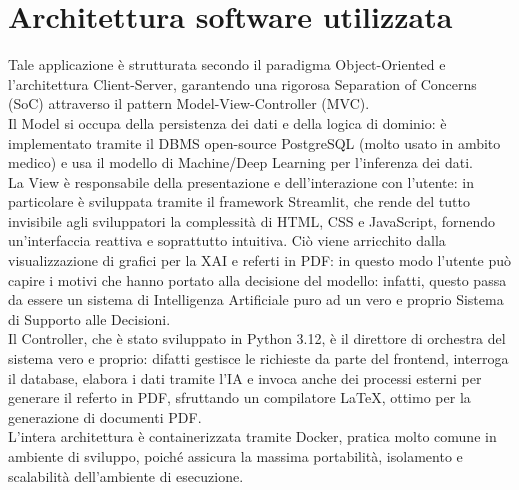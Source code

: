 \documentclass[10pt,a4paper]{article}
\begin{document}
    \section*{Architettura software utilizzata}
        Tale applicazione è strutturata secondo il paradigma Object-Oriented e l'architettura Client-Server, garantendo 
        una rigorosa Separation of Concerns (SoC) attraverso il pattern Model-View-Controller (MVC). \\
        Il Model si occupa della persistenza dei dati e della logica di dominio: è implementato tramite il DBMS 
        open-source PostgreSQL (molto usato in ambito medico) e usa il modello di Machine/Deep Learning per l'inferenza 
        dei dati. \\
        La View è responsabile della presentazione e dell'interazione con l'utente: in particolare è sviluppata tramite il 
        framework Streamlit, che rende del tutto invisibile agli sviluppatori la complessità di HTML, CSS e JavaScript,
        fornendo un'interfaccia reattiva e soprattutto intuitiva. Ciò viene arricchito dalla visualizzazione di grafici 
        per la XAI e referti in PDF: in questo modo l'utente può capire i motivi che hanno portato alla
        decisione del modello: infatti, questo passa da essere un sistema di Intelligenza Artificiale puro ad un vero e
        proprio Sistema di Supporto alle Decisioni. \\
        Il Controller, che è stato sviluppato in Python 3.12, è il direttore di orchestra del sistema vero e proprio: 
        difatti gestisce le richieste da parte del frontend, interroga il database, elabora i dati tramite l'IA e invoca
        anche dei processi esterni per generare il referto in PDF, sfruttando un compilatore LaTeX, ottimo per la
        generazione di documenti PDF.\\
        L'intera architettura è containerizzata tramite Docker, pratica molto comune in ambiente di sviluppo, poiché 
        assicura la massima portabilità, isolamento e scalabilità dell'ambiente di esecuzione.
    
\end{document}
